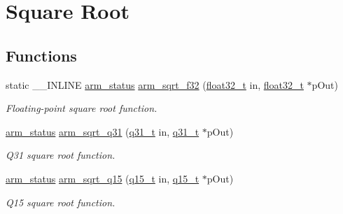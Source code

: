 \hypertarget{group___s_q_r_t}{}\section{Square Root}
\label{group___s_q_r_t}
\subsection*{Functions}
\begin{DoxyCompactItemize}
\item 
static \+\_\+\+\_\+\+I\+N\+L\+I\+NE \hyperlink{arm__math_8h_a5e459c6409dfcd2927bb8a57491d7cf6}{arm\+\_\+status} \hyperlink{group___s_q_r_t_ga56a40d1cf842b0b45267df6761975da0}{arm\+\_\+sqrt\+\_\+f32} (\hyperlink{arm__math_8h_a4611b605e45ab401f02cab15c5e38715}{float32\+\_\+t} in, \hyperlink{arm__math_8h_a4611b605e45ab401f02cab15c5e38715}{float32\+\_\+t} $\ast$p\+Out)
\begin{DoxyCompactList}\small\item\em Floating-\/point square root function. \end{DoxyCompactList}\item 
\hyperlink{arm__math_8h_a5e459c6409dfcd2927bb8a57491d7cf6}{arm\+\_\+status} \hyperlink{group___s_q_r_t_ga119e25831e141d734d7ef10636670058}{arm\+\_\+sqrt\+\_\+q31} (\hyperlink{arm__math_8h_adc89a3547f5324b7b3b95adec3806bc0}{q31\+\_\+t} in, \hyperlink{arm__math_8h_adc89a3547f5324b7b3b95adec3806bc0}{q31\+\_\+t} $\ast$p\+Out)
\begin{DoxyCompactList}\small\item\em Q31 square root function. \end{DoxyCompactList}\item 
\hyperlink{arm__math_8h_a5e459c6409dfcd2927bb8a57491d7cf6}{arm\+\_\+status} \hyperlink{group___s_q_r_t_ga5abe5ca724f3e15849662b03752c1238}{arm\+\_\+sqrt\+\_\+q15} (\hyperlink{arm__math_8h_ab5a8fb21a5b3b983d5f54f31614052ea}{q15\+\_\+t} in, \hyperlink{arm__math_8h_ab5a8fb21a5b3b983d5f54f31614052ea}{q15\+\_\+t} $\ast$p\+Out)
\begin{DoxyCompactList}\small\item\em Q15 square root function. \end{DoxyCompactList}\end{DoxyCompactItemize}



